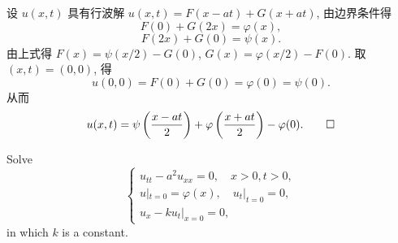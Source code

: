 \begin{solve}
  设 $u(x,t)$ 具有行波解 $u(x,t) = F(x-at)+G(x+at)$, 由边界条件得
  \[F(0)+G(2x) = \varphi(x),\]
  \[F(2x)+G(0) = \psi(x).\]
  由上式得 $F(x) = \psi(x/2)-G(0)$, $G(x) = \varphi(x/2)-F(0)$.
  取 $(x,t) = (0,0)$, 得
  \[u(0,0) = F(0) + G(0) = \varphi(0) = \psi(0).\]
  从而
  \[ u(x,t) = \psi\left(\frac{x-at}{2}\right)
    + \varphi\left(\frac{x+at}{2}\right)-\varphi(0). \qedhere\]
\end{solve}


\begin{exercise}[5]
  Solve
  \[\begin{cases}
    u_{tt} - a^2 u_{xx} = 0,\quad x>0, t>0, \\
    u|_{t=0} = \varphi(x),\quad u_t|_{t=0} = 0, \\
    u_x - ku_t|_{x=0} = 0,
  \end{cases}\]
  in which $k$ is a constant.
\end{exercise}

